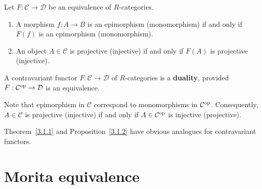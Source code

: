 %




\begin{proposition}\label{3.1.2}
  Let $F: \mathcal{C} \to \mathcal{D}$ be an equivalence of $R$-categories.
  \begin{enumerate}
  \item A morphism $f: A \to B$ is an epimorphism (monomorphism) if and only if
    $F(f)$ is an epimorphism (monomorphism).
  \item An object $A \in \mathcal{C}$ is projective (injective) if and only if $F(A)$ is
    projective (injective).
  \end{enumerate}
\end{proposition}


\begin{definition}
  A contravariant functor $F: \mathcal{C} \to \mathcal{D}$ of $R$-categories is a \textbf{duality},
  provided $F: \mathcal{C}^{\mathrm{op}} \to \mathcal{D}$ is an equivalence.
\end{definition}


Note that epimorphism in $\mathcal{C}$ correspond to monomorphisms in $\mathcal{C}^{\mathrm{op}}$.
Consequently, $A \in \mathcal{C}$ is projective (injective) if and only if $A \in \mathcal{C}^{\mathrm{op}}$ is
injective (projective).

Theorem~\ref{3.1.1} and Proposition~\ref{3.1.2} have obvious analogues for
contravariant functors.


\section{Morita equivalence}

